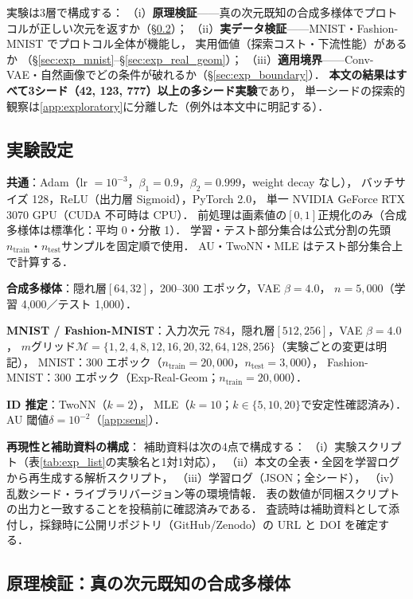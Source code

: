 \documentclass[11pt,a4paper]{jsarticle}
\begin{document}
実験は3層で構成する：
（i）\textbf{原理検証}——真の次元既知の合成多様体でプロトコルが正しい次元を返すか（§\ref{sec:exp_syn}）；
（ii）\textbf{実データ検証}——MNIST・Fashion-MNIST でプロトコル全体が機能し，
実用価値（探索コスト・下流性能）があるか
（§\ref{sec:exp_mnist}--§\ref{sec:exp_real_geom}）；
（iii）\textbf{適用境界}——Conv-VAE・自然画像でどの条件が破れるか（§\ref{sec:exp_boundary}）．
\textbf{本文の結果はすべて3シード（42, 123, 777）以上の多シード実験}であり，
単一シードの探索的観察は\ref{app:exploratory}に分離した（例外は本文中に明記する）．

\subsection{実験設定}\label{sec:exp_setup}

\textbf{共通}：Adam（lr $= 10^{-3}$，$\beta_1 = 0.9$，$\beta_2 = 0.999$，weight decay なし），
バッチサイズ 128，ReLU（出力層 Sigmoid），PyTorch 2.0，
単一 NVIDIA GeForce RTX 3070 GPU（CUDA 不可時は CPU）．
前処理は画素値の$[0,1]$正規化のみ（合成多様体は標準化：平均 0・分散 1）．
学習・テスト部分集合は公式分割の先頭$n_{\mathrm{train}}$・$n_{\mathrm{test}}$サンプルを固定順で使用．
AU・TwoNN・MLE はテスト部分集合上で計算する．

\textbf{合成多様体}：隠れ層$[64, 32]$，200--300 エポック，VAE $\beta = 4.0$，
$n = 5{,}000$（学習 4,000／テスト 1,000）．

\textbf{MNIST / Fashion-MNIST}：入力次元 784，隠れ層$[512, 256]$，VAE $\beta = 4.0$，
$m$グリッド$\mathcal{M} = \{1, 2, 4, 8, 12, 16, 20, 32, 64, 128, 256\}$（実験ごとの変更は明記），
MNIST：300 エポック（$n_{\mathrm{train}} = 20{,}000$，$n_{\mathrm{test}} = 3{,}000$），
Fashion-MNIST：300 エポック（Exp-Real-Geom；$n_{\mathrm{train}} = 20{,}000$）．

\textbf{ID 推定}：TwoNN（$k = 2$）\cite{facco2017twonn}，
MLE（$k = 10$；$k \in \{5, 10, 20\}$で安定性確認済み）\cite{levina2005mle}．
AU 閾値$\delta = 10^{-2}$（\ref{app:sens}）．

\textbf{再現性と補助資料の構成}：
補助資料は次の4点で構成する：
（i）実験スクリプト（表\ref{tab:exp_list}の実験名と1対1対応），
（ii）本文の全表・全図を学習ログから再生成する解析スクリプト，
（iii）学習ログ（JSON；全シード），
（iv）乱数シード・ライブラリバージョン等の環境情報．
表の数値が同梱スクリプトの出力と一致することを投稿前に確認済みである．
査読時は補助資料として添付し，採録時に公開リポジトリ（GitHub/Zenodo）の
URL と DOI を確定する．

\subsection{原理検証：真の次元既知の合成多様体}\label{sec:exp_syn}
\end{document}
